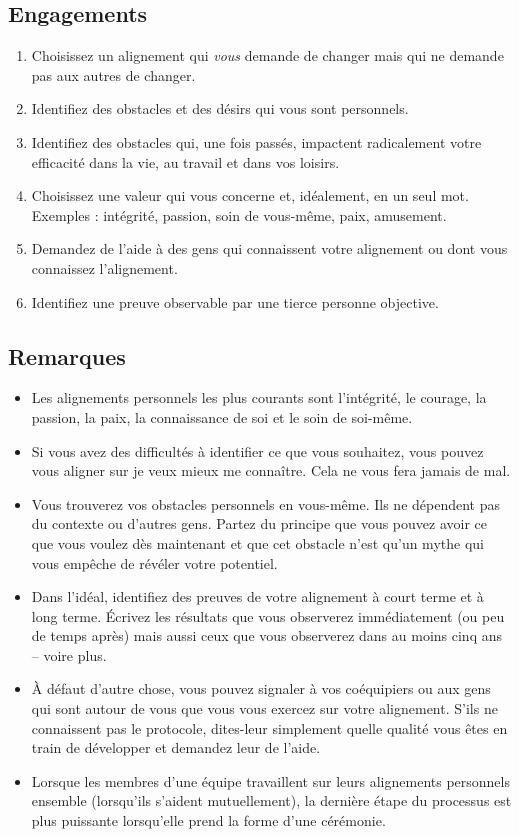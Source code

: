 \documentclass[paper=6in:9in,pagesize=pdftex,headinclude=on,footinclude=on,11pt]{scrbook}
\begin{document}
\subsection{Engagements}
\begin{enumerate}
	\item Choisissez un alignement qui \emph{vous} demande de changer mais qui ne demande pas aux autres de changer.
	\item Identifiez des obstacles et des désirs qui vous sont personnels.
	\item Identifiez des obstacles qui, une fois passés, impactent radicalement votre efficacité dans la vie, au travail et dans vos loisirs.
	\item Choisissez une valeur qui vous concerne et, idéalement, en un seul mot. Exemples : intégrité, passion, soin de vous-même, paix, amusement.
	\item Demandez de l'aide à des gens qui connaissent votre alignement ou dont vous connaissez l'alignement.
	\item Identifiez une preuve observable par une tierce personne objective.
\end{enumerate}

\subsection{Remarques}
\begin{itemize}
	\item Les alignements personnels les plus courants sont l'intégrité, le courage, la passion, la paix, la connaissance de soi et le soin de soi-même.
	\item Si vous avez des difficultés à identifier ce que vous souhaitez, vous pouvez vous aligner sur \og{}je veux mieux me connaître\fg{}. Cela ne vous
	      fera jamais de mal.
	\item Vous trouverez vos obstacles personnels en vous-même. Ils ne dépendent pas du contexte ou d'autres gens. Partez du principe que vous pouvez avoir ce
	      que vous voulez dès maintenant et que cet obstacle n'est qu'un mythe qui vous empêche de révéler votre potentiel.
	\item Dans l'idéal, identifiez des preuves de votre alignement à court terme et à long terme. Écrivez les résultats que vous observerez immédiatement (ou
	      peu de temps après) mais aussi ceux que vous observerez dans au moins cinq ans -- voire plus.
	\item À défaut d'autre chose, vous pouvez signaler à vos coéquipiers ou aux gens qui sont autour de vous que vous vous exercez sur votre alignement.
	      S'ils ne connaissent pas le protocole, dites-leur simplement quelle qualité vous êtes en train de développer et demandez leur de l'aide.
	\item Lorsque les membres d'une équipe travaillent sur leurs alignements personnels ensemble (lorsqu'ils s'aident mutuellement), la dernière étape du
	      processus est plus puissante lorsqu'elle prend la forme d'une cérémonie.
\end{itemize}
\end{document}
